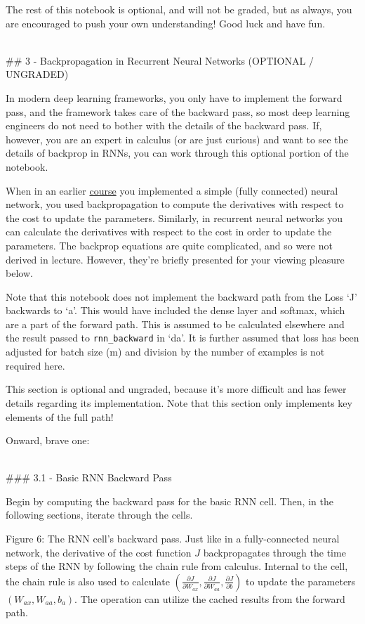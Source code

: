 \documentclass[11pt]{article}
\begin{document}
The rest of this notebook is optional, and will not be graded, but as
always, you are encouraged to push your own understanding! Good luck and
have fun.

    ~\\
\#\# 3 - Backpropagation in Recurrent Neural Networks (OPTIONAL /
UNGRADED)

In modern deep learning frameworks, you only have to implement the
forward pass, and the framework takes care of the backward pass, so most
deep learning engineers do not need to bother with the details of the
backward pass. If, however, you are an expert in calculus (or are just
curious) and want to see the details of backprop in RNNs, you can work
through this optional portion of the notebook.

When in an earlier
\href{https://www.coursera.org/learn/neural-networks-deep-learning/lecture/0VSHe/derivatives-with-a-computation-graph}{course}
you implemented a simple (fully connected) neural network, you used
backpropagation to compute the derivatives with respect to the cost to
update the parameters. Similarly, in recurrent neural networks you can
calculate the derivatives with respect to the cost in order to update
the parameters. The backprop equations are quite complicated, and so
were not derived in lecture. However, they're briefly presented for your
viewing pleasure below.

    Note that this notebook does not implement the backward path from the
Loss `J' backwards to `a'. This would have included the dense layer and
softmax, which are a part of the forward path. This is assumed to be
calculated elsewhere and the result passed to \texttt{rnn\_backward} in
`da'. It is further assumed that loss has been adjusted for batch size
(m) and division by the number of examples is not required here.

    This section is optional and ungraded, because it's more difficult and
has fewer details regarding its implementation. Note that this section
only implements key elements of the full path!

Onward, brave one:

    ~\\
\#\#\# 3.1 - Basic RNN Backward Pass

Begin by computing the backward pass for the basic RNN cell. Then, in
the following sections, iterate through the cells.

Figure 6: The RNN cell's backward pass. Just like in a fully-connected
neural network, the derivative of the cost function \(J\) backpropagates
through the time steps of the RNN by following the chain rule from
calculus. Internal to the cell, the chain rule is also used to calculate
\((\frac{\partial J}{\partial W_{ax}},\frac{\partial J}{\partial W_{aa}},\frac{\partial J}{\partial b})\)
to update the parameters \((W_{ax}, W_{aa}, b_a)\). The operation can
utilize the cached results from the forward path.
\end{document}
